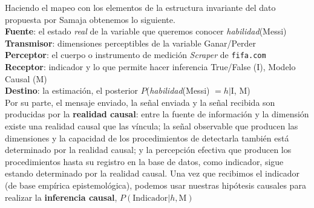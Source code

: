 \documentclass[a4paper,11pt]{book}
\theoremstyle{definition}
\begin{document}

Haciendo el mapeo con los elementos de la estructura invariante del dato propuesta por Samaja obtenemos lo siguiente. \\[0.1cm]
\noindent \textbf{Fuente}: el estado \textit{real} de la variable que  queremos conocer \hfill
\textit{habilidad}(Messi)\\
\textbf{Transmisor}: dimensiones perceptibles de la variable \hfill
Ganar/Perder\\
\textbf{Perceptor}: el cuerpo o instrumento de medición \hfill
\textit{Scraper} de \texttt{fifa.com}  \\
\textbf{Receptor}: indicador y lo que permite hacer inferencia \hfill
True/False (I), Modelo Causal (M)\\
\textbf{Destino}: la estimación, el posterior   \hfill
$P$(\textit{habilidad}(Messi) $= h|$I, M) \\


Por su parte, el mensaje enviado, la señal enviada y la señal recibida son producidas por la \textbf{realidad causal}:
%
entre la fuente de información y la dimensión existe una realidad causal que las víncula;
%
la señal observable que producen las dimensiones y la capacidad de los procedimientos de detectarla también está determinado por la realidad causal;
%
y la percepción efectiva que producen los procedimientos hasta su registro en la base de datos, como indicador, sigue estando determinado por la realidad causal.
%
Una vez que recibimos el indicador (de base empírica epistemológica), podemos usar nuestras hipótesis causales para realizar la \textbf{inferencia causal}, $P(\text{Indicador}|h, \text{M})$ \\

\end{document}
